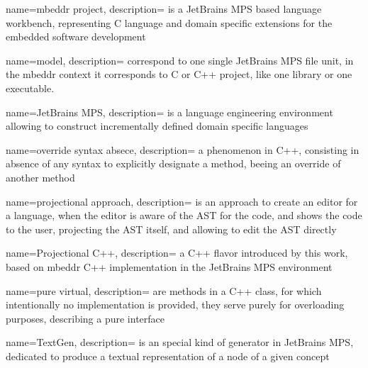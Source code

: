 {
  name=mbeddr project,
  description={ is a JetBrains MPS based language workbench, representing C language and domain specific
  extensions for the embedded software development}
}

{
  name=model,
  description={ correspond to one single JetBrains MPS file unit, in the mbeddr context it corresponds to C or C++ project, like one library or one executable.}
}

{
  name=JetBrains MPS,
  description={ is a language engineering environment 
  allowing to construct incrementally defined domain specific languages}
}

{
  name=override syntax absece,
  description={ a phenomenon in C++, consisting in absence of any syntax to explicitly designate a method, beeing an override
  of another method}
}



{
  name=projectional approach,
  description={ is an approach to create an editor for a language, when the editor is 
  aware of the AST for the code, and shows the code to the user, projecting the 
  AST itself, and allowing to edit the AST directly}
}

{
  name=Projectional C++,
  description={ a C++ flavor introduced by this work, based on mbeddr C++ implementation in the JetBrains MPS environment}
}

{
  name=pure virtual,
  description={ are methods in a C++ class, for which intentionally no implementation is provided, they serve purely for overloading purposes, 
  describing a pure interface}
}


{
  name=TextGen,
  description={ is an special kind of generator in JetBrains MPS, dedicated to produce a textual representation of a node of a given concept}
}
